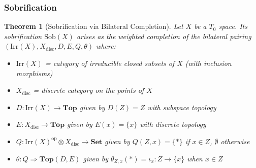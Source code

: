 \documentclass[11pt]{article}
\theoremstyle{plain}
\newtheorem{theorem}{Theorem}[section]
\theoremstyle{definition}
\theoremstyle{remark}
\newcommand{\op}{\mathrm{op}}
\begin{document}
\subsubsection{Sobrification}

\begin{theorem}[Sobrification via Bilateral Completion]\label{thm:sobrification-bilateral}
Let $X$ be a $T_0$ space. Its sobrification $\text{Sob}(X)$ arises as the weighted completion of the bilateral pairing $(\mathrm{Irr}(X), X_{\text{disc}}, D, E, Q, \theta)$ where:
\begin{itemize}
\item $\mathrm{Irr}(X)$ = category of irreducible closed subsets of $X$ (with inclusion morphisms)
\item $X_{\text{disc}}$ = discrete category on the points of $X$
\item $D : \mathrm{Irr}(X) \to \mathbf{Top}$ given by $D(Z) = Z$ with subspace topology
\item $E : X_{\text{disc}} \to \mathbf{Top}$ given by $E(x) = \{x\}$ with discrete topology
\item $Q : \mathrm{Irr}(X)^{\op} \otimes X_{\text{disc}} \to \mathbf{Set}$ given by $Q(Z, x) = \{*\}$ if $x \in Z$, $\emptyset$ otherwise
\item $\theta : Q \Rightarrow \mathbf{Top}(D, E)$ given by $\theta_{Z,x}(*) = \iota_x : Z \to \{x\}$ when $x \in Z$
\end{itemize}
\end{theorem}
\end{document}
